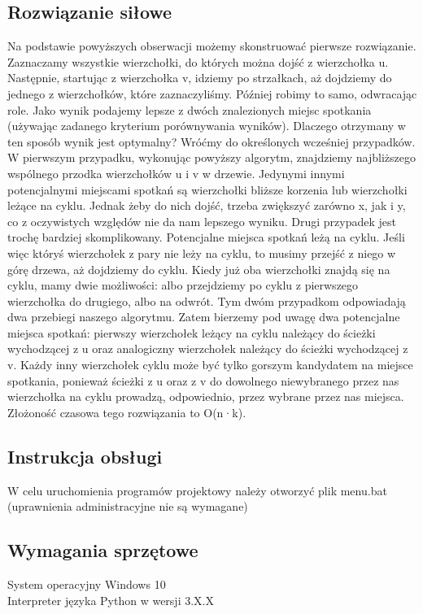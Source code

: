 \documentclass[12pt,a4paper]{article}
\begin{document}
\subsection{Rozwiązanie siłowe}
Na podstawie powyższych obserwacji możemy skonstruować pierwsze rozwiązanie.
Zaznaczamy wszystkie wierzchołki, do których można dojść z wierzchołka u. Następnie, startując z wierzchołka v, idziemy po strzałkach, aż dojdziemy do jednego
z wierzchołków, które zaznaczyliśmy. Później robimy to samo, odwracając role. Jako
wynik podajemy lepsze z dwóch znalezionych miejsc spotkania (używając zadanego
kryterium porównywania wyników).
Dlaczego otrzymany w ten sposób wynik jest optymalny? Wróćmy do określonych
wcześniej przypadków.
W pierwszym przypadku, wykonując powyższy algorytm, znajdziemy najbliższego
wspólnego przodka wierzchołków u i v w drzewie. Jedynymi innymi potencjalnymi
miejscami spotkań są wierzchołki bliższe korzenia lub wierzchołki leżące na cyklu.
Jednak żeby do nich dojść, trzeba zwiększyć zarówno x, jak i y, co z oczywistych
względów nie da nam lepszego wyniku.
Drugi przypadek jest trochę bardziej skomplikowany. Potencjalne miejsca spotkań
leżą na cyklu. Jeśli więc któryś wierzchołek z pary nie leży na cyklu, to musimy przejść
z niego w górę drzewa, aż dojdziemy do cyklu. Kiedy już oba wierzchołki znajdą się na
cyklu, mamy dwie możliwości: albo przejdziemy po cyklu z pierwszego wierzchołka
do drugiego, albo na odwrót. Tym dwóm przypadkom odpowiadają dwa przebiegi
naszego algorytmu. Zatem bierzemy pod uwagę dwa potencjalne miejsca spotkań:
pierwszy wierzchołek leżący na cyklu należący do ścieżki wychodzącej z u oraz analogiczny wierzchołek należący do ścieżki wychodzącej z v. Każdy inny wierzchołek
cyklu może być tylko gorszym kandydatem na miejsce spotkania, ponieważ ścieżki
z u oraz z v do dowolnego niewybranego przez nas wierzchołka na cyklu prowadzą,
odpowiednio, przez wybrane przez nas miejsca.
Złożoność czasowa tego rozwiązania to O(n·k).

           
	\subsection{Instrukcja obsługi}
	W celu uruchomienia programów projektowy należy otworzyć plik menu.bat (uprawnienia administracyjne nie są wymagane)

	
	
	
	\subsection{Wymagania sprzętowe}
	System operacyjny Windows 10\\
	Interpreter języka Python w wersji 3.X.X
	
\end{document}
